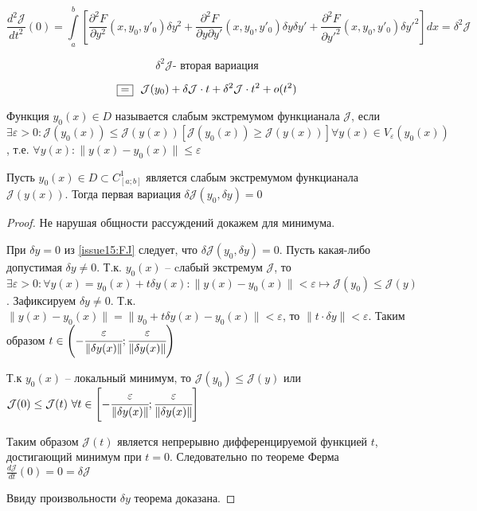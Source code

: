 \begin{equation} \label{issue15:SJ}
    \frac{d^2 \mathcal{J}}{dt^2}(0) = \int \limits_a^b \left[  \frac{\partial^2 F}{\partial y^2}(x, y_0, y'_0) \delta y^2 
    + \frac{\partial^2 F}{\partial y \partial {y'}} (x, y_0, y'_0) \delta y \delta {y'} + \frac{\partial^2 F}{\partial {y'}^2} (x, y_0, y'_0) \delta {y'}^2  \right] dx 
    = \delta^2 \mathcal{J}
\end{equation}

\[ \delta^2 \mathcal{J} \text{- вторая вариация} \]

\[ \fbox{=}~~ \mathcal{J}(y_0) + \delta \mathcal{J}\cdot t + \delta^2 \mathcal{J} \cdot t^2 + o(t^2)\]

\begin{definition}
    Функция $y_0(x) \in D$ называется слабым экстремумом функцианала $\mathcal{J}$, если $\exists \varepsilon > 0: \mathcal{J}(y_0(x)) \leq \mathcal{J}(y(x)) \left[ \mathcal{J}(y_0(x)) \geq \mathcal{J}(y(x)) \right] \forall y(x) \in V_{\varepsilon} (y_0(x))$, т.е. $\forall y(x): \| y(x) - y_0(x)\| \leq \varepsilon$ 
\end{definition}

\begin{theorem}
    Пусть $y_0(x) \in D \subset C^1_{[a;b]}$ является слабым экстремумом функцианала $\mathcal{J}(y(x))$. Тогда первая вариация $\delta \mathcal{J}(y_0, \delta y) = 0$ 
\end{theorem}
\begin{proof}
    Не нарушая общности рассуждений докажем для минимума.
    
    При $\delta y = 0$ из \eqref{issue15:FJ} следует, что $\delta \mathcal{J}(y_0, \delta y) = 0$. Пусть какая-либо допустимая $\delta y \neq 0$. Т.к. $y_0(x)$ -- cлабый экстремум $\mathcal{J}$, то $\exists \varepsilon > 0: \forall y(x) = y_0(x) + t \delta y(x): \| y(x) - y_0(x) \| < \varepsilon \mapsto \mathcal{J}(y_0) \leq \mathcal{J}(y)$. 
    Зафиксируем $\delta y \neq 0$. Т.к. $\| y(x) - y_0(x) \| = \| y_0 + t \delta y(x) - y_0(x)\| < \varepsilon$, то $\| t \cdot \delta y \| < \varepsilon $. Таким образом $t \in \left( - \cfrac{\varepsilon}{\| \delta y(x)\|}; \cfrac{\varepsilon}{\| \delta y(x)\|}\right)$  

    Т.к $y_0(x)$ -- локальный минимум, то $\mathcal{J}(y_0) \leq \mathcal{J}(y)$ или $\mathcal{J}(0) \leq \mathcal{J}(t)~\forall t \in \left[ - \cfrac{\varepsilon}{\| \delta y(x)\|}; \cfrac{\varepsilon}{\| \delta y(x)\|} \right]$ 

    Таким образом $\mathcal{J}(t)$ является непрерывно дифференцируемой функцией $t$, достигающий минимум при $t = 0$. Следовательно по теореме Ферма $\frac{d \mathcal{J}}{dt} (0) = 0 = \delta \mathcal{J}$
    
    Ввиду произвольности $\delta y$ теорема доказана. 
\end{proof}

